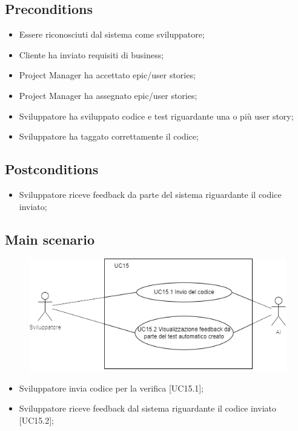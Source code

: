 \documentclass{article}
\begin{document}
    \subsection*{Preconditions}
        \begin{itemize}
            \item Essere riconosciuti dal sistema come sviluppatore;
            \item Cliente ha inviato requisiti di business;
            \item Project Manager ha accettato epic/user stories;
            \item Project Manager ha assegnato epic/user stories;
            \item Sviluppatore ha sviluppato codice e test riguardante una o più user story;
            \item Sviluppatore ha taggato correttamente il codice;
        \end{itemize}
        
    \subsection*{Postconditions}
        \begin{itemize}
            \item Sviluppatore riceve feedback da parte del sistema riguardante il codice inviato;
        \end{itemize}
    
    \subsection*{Main scenario}
        \begin{figure}[h]
          \centering
          \includegraphics{./imgUML/UC15-zoom.png}
          \label{fig:immagine}
        \end{figure}
        
        \begin{itemize}
            \item Sviluppatore invia codice per la verifica [UC15.1];

            \item Sviluppatore riceve feedback dal sistema riguardante il codice inviato [UC15.2];
        \end{itemize}
        
\end{document}
